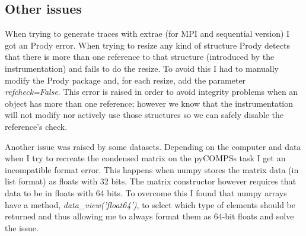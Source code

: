 \subsection{Other issues}


When trying to generate traces with extrae (for MPI and sequential version) I got an Prody error. When trying to resize any kind of structure Prody detects that there is more than one reference to that structure (introduced by the instrumentation) and fails to do the resize. To avoid this I had to manually modify the Prody package and, for each resize, add the parameter \textit{refcheck=False}. This error is raised in order to avoid integrity problems when an object has more than one reference; however we know that the instrumentation will not modify nor actively use those structures so we can safely disable the reference's check. 

Another issue was raised by some datasets. Depending on the computer and data when I try to recreate the condensed matrix on the pyCOMPSs task I get an incompatible format error. This happens when numpy stores the matrix data (in list format) as floats with 32 bits. The matrix constructor however requires that data to be in floats with 64 bits. To overcome this I found that numpy arrays have a method, \textit{data\_view('float64')}, to select which type of elements should be returned and thus allowing me to always format them as 64-bit floats and solve the issue.







